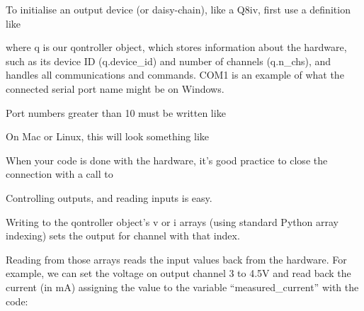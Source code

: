 \documentclass[letterpaper,10pt,english]{sphinxmanual}
\begin{document}
To initialise an output device (or daisy-chain), like a Q8iv, first use a definition like

%
\begin{sphinxVerbatim}[commandchars=\\\{\}]
    
\end{sphinxVerbatim}

where q is our qontroller object, which stores information about the hardware, such as its device ID (q.device\_id) and number of channels (q.n\_chs), and handles all communications and commands.
COM1 is an example of what the connected serial port name might be on Windows.

Port numbers greater than 10 must be written like

%
\begin{sphinxVerbatim}[commandchars=\\\{\}]
\end{sphinxVerbatim}

On Mac or Linux, this will look something like

%
\begin{sphinxVerbatim}[commandchars=\\\{\}]
\end{sphinxVerbatim}

When your code is done with the hardware, it’s good practice to close the connection with a call to

%
\begin{sphinxVerbatim}[commandchars=\\\{\}]
\end{sphinxVerbatim}

Controlling outputs, and reading inputs is easy.

Writing to the qontroller object’s v or i arrays (using standard Python array indexing) sets the output for channel with that index.

Reading from those arrays reads the input values back from the hardware. For example, we can set the voltage on output channel 3 to 4.5V and read back the current (in mA) assigning the value to the variable “measured\_current” with the code:
\end{document}
